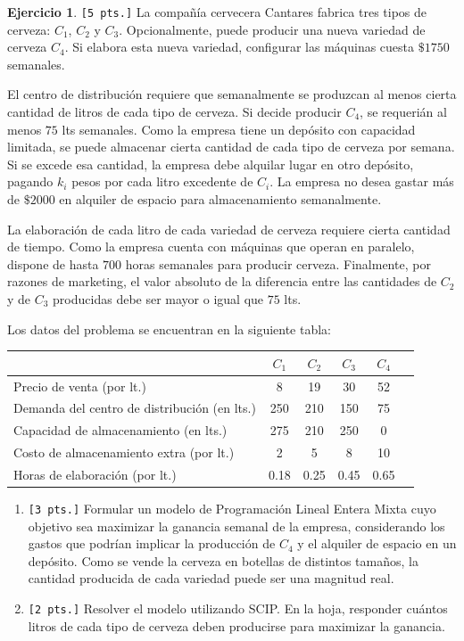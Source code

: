 \documentclass[a4paper,oneside,12pt]{amsart}
\theoremstyle{definition}
\newtheorem{quest}{Ejercicio}
\begin{document}
\begin{quest}
    \texttt{[5 pts.]} La compañía cervecera Cantares fabrica tres tipos de cerveza: $C_1$, $C_2$ y $C_3$.
    Opcionalmente, puede producir una nueva variedad de cerveza $C_4$. Si elabora esta nueva
    variedad, configurar las máquinas cuesta $\$1750$ semanales.

    El centro de distribución requiere que semanalmente se produzcan al menos cierta cantidad de litros de cada tipo
    de cerveza. Si decide producir $C_4$, se requerián al menos $75$ lts semanales.
    Como la empresa tiene un depósito con capacidad limitada, se puede almacenar cierta cantidad de cada
    tipo de cerveza por semana. Si se excede esa cantidad, la empresa debe alquilar lugar en otro depósito, pagando
    $k_i$ pesos por cada litro excedente de $C_i$. La empresa no desea gastar más de $\$2000$
    en alquiler de espacio para almacenamiento semanalmente.

    La elaboración de cada litro de cada variedad de cerveza requiere cierta cantidad de tiempo.
    Como la empresa cuenta con máquinas que operan en paralelo, dispone de hasta $700$ horas semanales para
    producir cerveza. Finalmente, por razones de marketing, el valor absoluto de la diferencia entre las
    cantidades de $C_2$ y de $C_3$ producidas debe ser mayor o igual que $75$ lts.

    Los datos del problema se encuentran en la siguiente tabla:
    \begin{table}[h!]
    \centering
    \begin{tabular}{lccccc}
         & $C_1$ & $C_2$ & $C_3$ & $C_4$ \\\midrule
        Precio de venta (por lt.) & 8 & 19 & 30 & 52 \\
        Demanda del centro de distribución (en lts.) & 250 & 210 & 150 & 75 \\
        Capacidad de almacenamiento (en lts.) & 275 & 210 & 250 & 0 \\
        Costo de almacenamiento extra (por lt.) & 2 & 5 & 8 & 10 \\
        Horas de elaboración (por lt.) & 0.18 & 0.25 & 0.45 & 0.65 \\\bottomrule
    \end{tabular}
\end{table}

    \begin{enumerate}[label=\alph*)]
        \item \texttt{[3 pts.]} Formular un modelo de Programación Lineal Entera Mixta cuyo objetivo sea maximizar la
        ganancia semanal
        de la empresa, considerando los gastos que podrían implicar la producción de $C_4$ y el alquiler de espacio
        en un depósito.
        Como se vende la cerveza en botellas de distintos tamaños, la cantidad producida de cada variedad puede ser
        una magnitud real.
        \item \texttt{[2 pts.]} Resolver el modelo utilizando SCIP. En la hoja, responder cuántos litros de cada
        tipo de cerveza deben producirse para maximizar la ganancia.
    \end{enumerate}

\end{quest}


\end{document}
